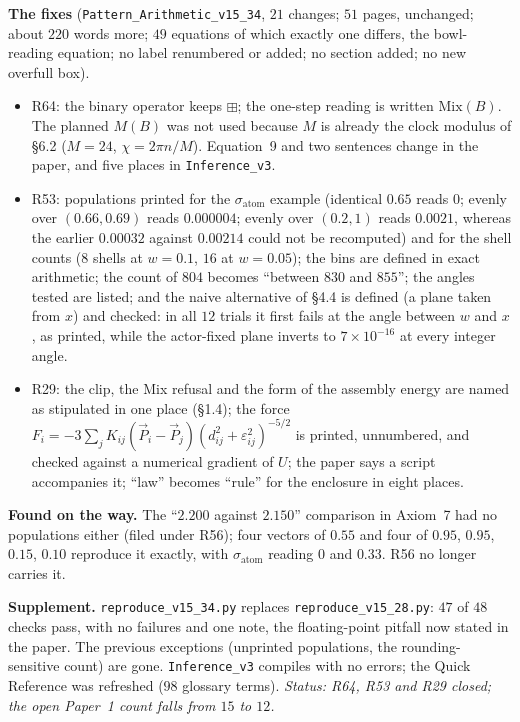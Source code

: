 \documentclass[11pt]{article}
\begin{document}
\textbf{The fixes} (\texttt{Pattern\_Arithmetic\_v15\_34}, $21$ changes; $51$ pages, unchanged; about $220$ words more; $49$ equations of which exactly one differs, the bowl-reading equation; no label renumbered or added; no section added; no new overfull box).
\begin{itemize}
\item R64: the binary operator keeps $\boxplus$; the one-step reading is written $\mathrm{Mix}(B)$. The planned $M(B)$ was not used because $M$ is already the clock modulus of \S6.2 ($M=24$, $\chi=2\pi n/M$). Equation~9 and two sentences change in the paper, and five places in \texttt{Inference\_v3}.
\item R53: populations printed for the $\sigma_{\text{atom}}$ example (identical $0.65$ reads $0$; evenly over $(0.66,0.69)$ reads $0.000004$; evenly over $(0.2,1)$ reads $0.0021$, whereas the earlier $0.00032$ against $0.00214$ could not be recomputed) and for the shell counts ($8$ shells at $w=0.1$, $16$ at $w=0.05$); the bins are defined in exact arithmetic; the count of $804$ becomes ``between $830$ and $855$''; the angles tested are listed;
and the naive alternative of \S4.4 is defined (a plane taken from $x$) and checked: in all $12$ trials it first fails at the angle between $w$ and $x$, as printed, while the actor-fixed plane inverts to $7\times10^{-16}$ at every integer angle.
\item R29: the clip, the Mix refusal and the form of the assembly energy are named as stipulated in one place (\S1.4); the force $F_i=-3\sum_jK_{ij}(\vec P_i-\vec P_j)(d_{ij}^2+\varepsilon_{ij}^2)^{-5/2}$ is printed, unnumbered, and checked against a numerical gradient of $U$; the paper says a script accompanies it; ``law'' becomes ``rule'' for the enclosure in eight places.
\end{itemize}
\textbf{Found on the way.} The ``$2.200$ against $2.150$'' comparison in Axiom~7 had no populations either (filed under R56); four vectors of $0.55$ and four of $0.95$, $0.95$, $0.15$, $0.10$ reproduce it exactly, with $\sigma_{\text{atom}}$ reading $0$ and $0.33$. R56 no longer carries it.

\textbf{Supplement.} \texttt{reproduce\_v15\_34.py} replaces \texttt{reproduce\_v15\_28.py}: $47$ of $48$ checks pass, with no failures and one note, the floating-point pitfall now stated in the paper. The previous exceptions (unprinted populations, the rounding-sensitive count) are gone. \texttt{Inference\_v3} compiles with no errors; the Quick Reference was refreshed ($98$ glossary terms).
\emph{Status: R64, R53 and R29 closed; the open Paper~1 count falls from $15$ to $12$.}
\end{document}

